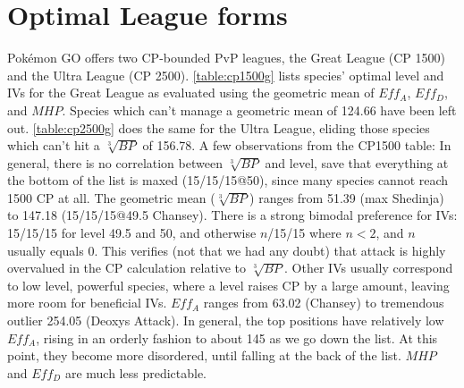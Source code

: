 \section{Optimal League forms}
Pokémon GO offers two CP-bounded PvP leagues, the Great League (CP 1500) and
   the Ultra League (CP 2500).
\autoref{table:cp1500g} lists species' optimal level and IVs for the Great League
  as evaluated using the geometric mean of $Eff_A$, $Eff_D$, and $MHP$.
Species which can't manage a geometric mean of 124.66 have been left out.
\autoref{table:cp2500g} does the same for the Ultra League, eliding those species which
  can't hit a $\sqrt[3]{BP}$ of 156.78.
A few observations from the CP1500 table:
In general, there is no correlation between $\sqrt[3]{BP}$ and level,
  save that everything at the bottom of the list is maxed (15/15/15@50),
  since many species cannot reach 1500 CP at all.
The geometric mean ($\sqrt[3]{BP}$) ranges from 51.39 (max Shedinja)
  to 147.18 (15/15/15@49.5 Chansey).
There is a strong bimodal preference for IVs: 15/15/15 for level 49.5
  and 50, and otherwise $n$/15/15 where $n < 2$, and $n$ usually equals 0.
This verifies (not that we had any doubt) that attack is highly overvalued in the CP calculation relative to $\sqrt[3]{BP}$.
Other IVs usually correspond to low level, powerful species, where a level
  raises CP by a large amount, leaving more room for beneficial IVs.
$Eff_A$ ranges from 63.02 (Chansey) to tremendous outlier 254.05 (Deoxys Attack).
In general, the top positions have relatively low $Eff_A$, rising in an
  orderly fashion to about 145 as we go down the list.
At this point, they become more disordered, until falling at the back
  of the list.
$MHP$ and $Eff_D$ are much less predictable.
